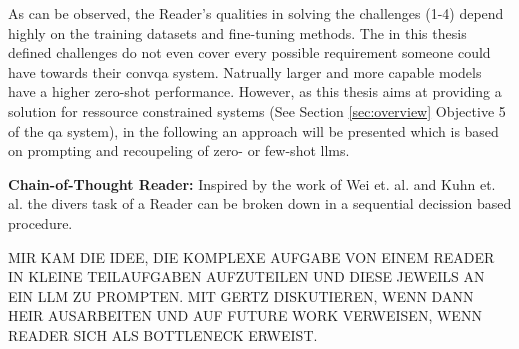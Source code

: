 As can be observed, the Reader's qualities in solving the challenges (1-4) depend highly on the training datasets and fine-tuning methods. The in this thesis defined challenges do not even cover every possible requirement someone could have towards their \gls{convqa} system. Natrually larger and more capable models have a higher zero-shot performance. However, as this thesis aims at providing a solution for ressource constrained systems (See Section \ref{sec:overview} Objective 5 of the \gls{qa} system), in the following an approach will be presented which is based on prompting and recoupeling of zero- or few-shot \gls{llm}s.

\vspace{\baselineskip}

\textbf{Chain-of-Thought Reader:} Inspired by the work of Wei et. al. \cite{wei_chain--thought_2023} and Kuhn et. al. \cite{kuhn_clam_2023} the divers task of a Reader can be broken down in a sequential decission based procedure.

MIR KAM DIE IDEE, DIE KOMPLEXE AUFGABE VON EINEM READER IN KLEINE TEILAUFGABEN AUFZUTEILEN UND DIESE JEWEILS AN EIN LLM ZU PROMPTEN. MIT GERTZ DISKUTIEREN, WENN DANN HEIR AUSARBEITEN UND AUF FUTURE WORK VERWEISEN, WENN READER SICH ALS BOTTLENECK ERWEIST.







